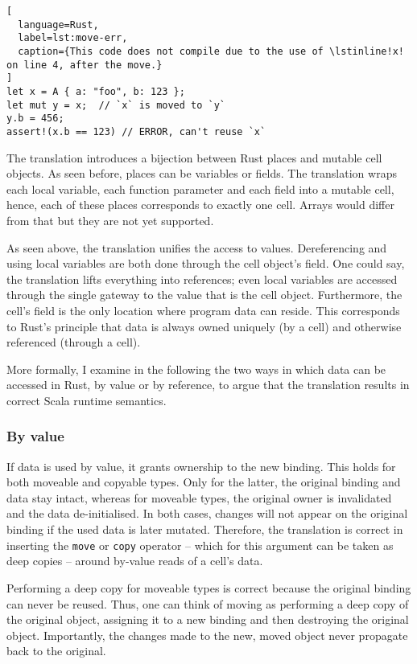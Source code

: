 \begin{lstlisting}[
  language=Rust,
  label=lst:move-err,
  caption={This code does not compile due to the use of \lstinline!x! on line 4, after the move.}
]
let x = A { a: "foo", b: 123 };
let mut y = x;  // `x` is moved to `y`
y.b = 456;
assert!(x.b == 123) // ERROR, can't reuse `x`
\end{lstlisting}

The translation introduces a bijection between Rust places and mutable cell
objects. As seen before, places can be variables or fields. The translation
wraps each local variable, each function parameter and each field into a mutable
cell, hence, each of these places corresponds to exactly one cell. Arrays would
differ from that but they are not yet supported.

As seen above, the translation unifies the access to values. Dereferencing and
using local variables are both done through the cell object's field. One could
say, the translation lifts everything into references; even local variables are
accessed through the single gateway to the value that is the cell object.
Furthermore, the cell's field is the only location where program data can
reside. This corresponds to Rust's principle that data is always owned uniquely
(by a cell) and otherwise referenced (through a cell).

More formally, I examine in the following the two ways in which data can be
accessed in Rust, by value or by reference, to argue that the translation
results in correct Scala runtime semantics.

\subsubsection{By value}
\label{sec:correctness-by-value}

If data is used by value, it grants ownership to the new binding. This holds for
both moveable and copyable types. Only for the latter, the original binding and
data stay intact, whereas for moveable types, the original owner is invalidated
and the data de-initialised. In both cases, changes will not appear on the
original binding if the used data is later mutated. Therefore, the translation
is correct in inserting the \lstinline!move! or \lstinline!copy! operator --
which for this argument can be taken as deep copies -- around by-value reads of
a cell's data.

Performing a deep copy for moveable types is correct because the original
binding can never be reused. Thus, one can think of moving as performing a deep
copy of the original object, assigning it to a new binding and then destroying
the original object. Importantly, the changes made to the new, moved object
never propagate back to the original.

